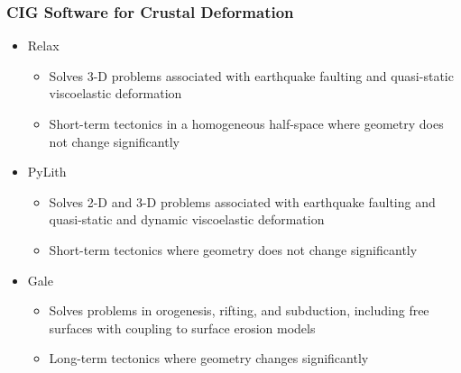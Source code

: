 \documentclass{beamer}
\begin{document}
\begin{frame}
  \frametitle{CIG Software for Crustal Deformation}
  \summary{}

  \begin{itemize}
  \item Relax
    \begin{itemize}
    \item Solves 3-D problems associated with earthquake faulting and
      quasi-static viscoelastic deformation
    \item Short-term tectonics in a homogeneous half-space where
      geometry does not change significantly
    \end{itemize}
  \item PyLith
    \begin{itemize}
    \item Solves 2-D and 3-D problems associated with earthquake
      faulting and quasi-static and dynamic viscoelastic deformation
    \item Short-term tectonics where geometry does not change
      significantly
    \end{itemize}
  \item Gale
    \begin{itemize}
    \item Solves problems in orogenesis, rifting, and subduction,
      including free surfaces with coupling to surface erosion models
    \item Long-term tectonics where geometry changes significantly
    \end{itemize}
  \end{itemize}
 
\end{frame}

 
\end{document}
